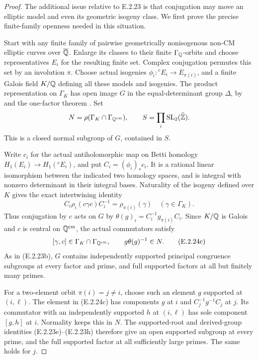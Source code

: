 \begin{proof}
The additional issue relative to E.2.23 is that conjugation
may move an elliptic model and even its geometric isogeny
class. We first prove the precise finite-family openness
needed in this situation.

Start with any finite family of pairwise geometrically
nonisogenous non-CM elliptic curves over \(\overline{\mathbb Q}\).
Enlarge its classes to their finite \(\Gamma_\mathbb Q\)-orbits
and choose representatives \(E_i\) for the resulting finite
set. Complex conjugation permutes this set by an involution
\(\pi\). Choose actual isogenies
\(\phi_i:{}^cE_i\to E_{\pi(i)}\), and a finite Galois
field \(K/\mathbb Q\) defining all these models and isogenies.
The product representation on \(\Gamma_K\) has open image
\(G\) in the equal-determinant group \(\Delta\), by
\cite[Theorem 1.1, author PDF p.1]{GenLombardo} and the
one-factor theorem \cite[Theorem 3, p.299]{GenSerre1972}.
Set
\[
 N=\rho(\Gamma_K\cap\Gamma_{\mathbb Q^{\mathrm{cm}}}),
 \qquad S=\prod_i\operatorname{SL}_2(\widehat{\mathbb Z}).
\]
This is a closed normal subgroup of \(G\), contained in \(S\).

Write \(c_i\) for the actual antiholomorphic map on Betti
homology \(H_1(E_i)\to H_1({}^cE_i)\), and put
\(C_i=(\phi_i)_*c_i\). It is a rational linear isomorphism
between the indicated two homology spaces, and is integral
with nonzero determinant in their integral bases.
Naturality of the isogeny defined over \(K\) gives the exact
intertwining identity
\[
 C_i\rho_i(c\gamma c)C_i^{-1}
                 =\rho_{\pi(i)}(\gamma)
                       \quad(\gamma\in\Gamma_K).
 \tag{E.2.24b}
\]
Thus conjugation by \(c\) acts on \(G\) by
\(\theta(g)_i=C_i^{-1}g_{\pi(i)}C_i\).
Since \(K/\mathbb Q\) is Galois and \(c\) is central on
\(\mathbb Q^{\mathrm{cm}}\), the actual commutators satisfy
\[
 [\gamma,c]\in\Gamma_K\cap\Gamma_{\mathbb Q^{\mathrm{cm}}},
 \qquad g\theta(g)^{-1}\in N.
 \tag{E.2.24c}
\]
As in (E.2.23b), \(G\) contains independently supported
principal congruence subgroups at every factor and prime,
and full supported factors at all but finitely many primes.

For a two-element orbit \(\pi(i)=j\ne i\), choose such
an element \(g\) supported at \((i,\ell)\).
The element in (E.2.24c) has components \(g\) at \(i\)
and \(C_j^{-1}g^{-1}C_j\) at \(j\).
Its commutator with an independently supported \(h\) at
\((i,\ell)\) has sole component \([g,h]\) at \(i\).
Normality keeps this in \(N\). The supported-root and
derived-group identities (E.2.23e)--(E.2.23h) therefore
give an open supported subgroup at every prime, and the
full supported factor at all sufficiently large primes.
The same holds for \(j\).


\end{proof}
